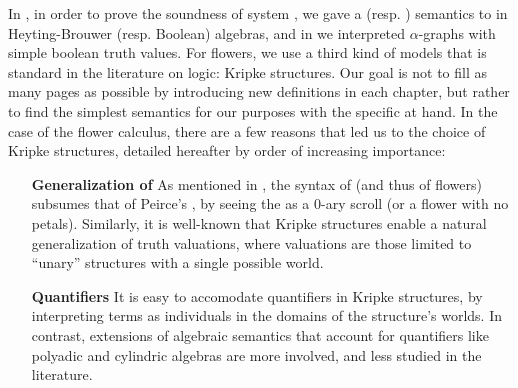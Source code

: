 \begin{scope}
In , in order to prove the soundness of system
, we gave a  (resp. ) semantics to  in
Heyting-Brouwer (resp. Boolean) algebras, and in  we
interpreted $\alpha$-graphs with simple boolean truth values. For flowers, we
use a third kind of models that is standard in the literature on 
logic: Kripke structures. Our goal is not to fill as many pages as possible by
introducing new definitions in each chapter, but rather to find the simplest
semantics for our purposes with the specific  at hand. In the case
of the flower calculus, there are a few reasons that led us to the choice of
Kripke structures, detailed hereafter by order of increasing importance:
\begin{itemize}
  \item[\textbf{Generalization of \kl{EGs}}]
    As mentioned in , the syntax of   (and thus of
    flowers) subsumes that of Peirce's  , by seeing the  as a
    $0$-ary scroll (or a flower with no petals). Similarly, it is well-known
    that Kripke structures enable a natural generalization of truth valuations,
    where  valuations are those limited to ``unary'' structures with a
    single possible world.
  
  \item[\textbf{Quantifiers}]
    It is easy to accomodate quantifiers in Kripke structures, by interpreting
    terms as individuals in the domains of the structure's worlds. In contrast,
    extensions of algebraic semantics that account for quantifiers like polyadic
    and cylindric algebras are more involved, and less studied in the
    literature.
  

\end{itemize}
\end{scope}
